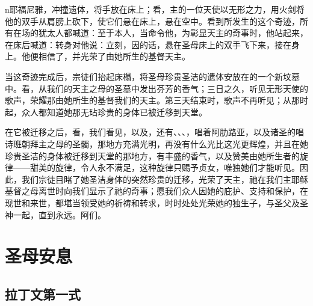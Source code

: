 n{耶福尼雅}，冲撞遗体，将手放在床上；看，主的一位天使以无形之力，用火剑将他的双手从肩膀上砍下，使它们悬在床上，悬在空中。看到所发生的这个奇迹，所有在场的犹太人都喊道：至于本人，当命令他，为彰显天主的奇事时，他站起来，在床后喊道：转身对他说：立刻，因的话，悬在圣母床上的双手飞下来，接在身上。他便相信了，并光荣了由她所生的基督天主。\par

当这奇迹完成后，宗徒们抬起床榻，将圣母珍贵圣洁的遗体安放在的一个新坟墓中。看，从我们的天主之母的圣墓中发出芬芳的香气；三日之久，听见无形天使的歌声，荣耀那由她所生的基督我们的天主。第三天结束时，歌声不再听见；从那时起，众人都知道她那无玷珍贵的身体已被迁移到天堂。\par

在它被迁移之后，看，我们看见，以及，还有、、、，唱着阿肋路亚，以及诸圣的唱诗班朝拜主之母的圣髑，那地方充满光明，再没有什么光比这光更辉煌，并且在她珍贵圣洁的身体被迁移到天堂的那地方，有丰盛的香气，以及赞美由她所生者的旋律——甜美的旋律，令人永不满足，这种旋律只赐予贞女，唯独她们才能听见。因此，我们宗徒目睹了她圣洁身体的突然珍贵的迁移，光荣了天主，祂在我们主耶稣基督之母离世时向我们显示了祂的奇事；愿我们众人因她的庇护、支持和保护，在现世和来世，都堪当领受她的祈祷和转求，时时处处光荣她的独生子，与圣父及圣神一起，直到永远。阿们。\par


\section{圣母安息}


\subsection{拉丁文第一式}

\par

